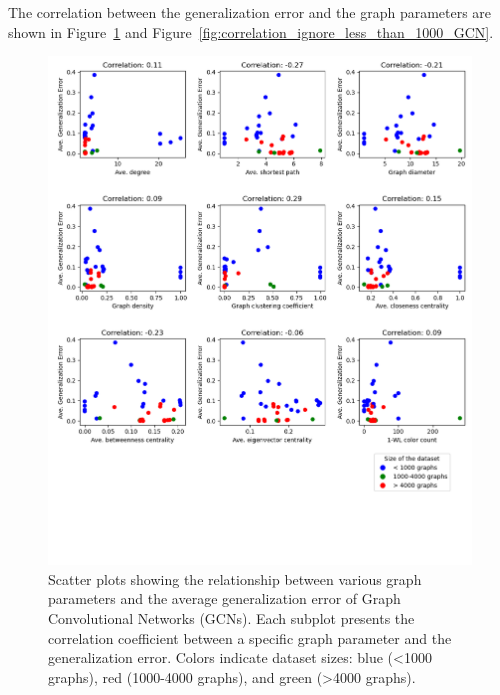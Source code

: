 The correlation between the generalization error and the graph parameters are shown in Figure~\ref{fig:correlation_GCN} and Figure~\ref{fig:correlation_ignore_less_than_1000_GCN}.

\begin{figure}[H]
    \centering
    \includegraphics[width=\textwidth]{images/correlation_GCN.png}
    \caption{Scatter plots showing the relationship between various graph parameters and the average generalization error of Graph Convolutional Networks (GCNs). Each subplot presents the correlation coefficient between a specific graph parameter and the generalization error. Colors indicate dataset sizes: blue (<1000 graphs), red (1000-4000 graphs), and green (>4000 graphs).}
    \label{fig:correlation_GCN}
\end{figure}

